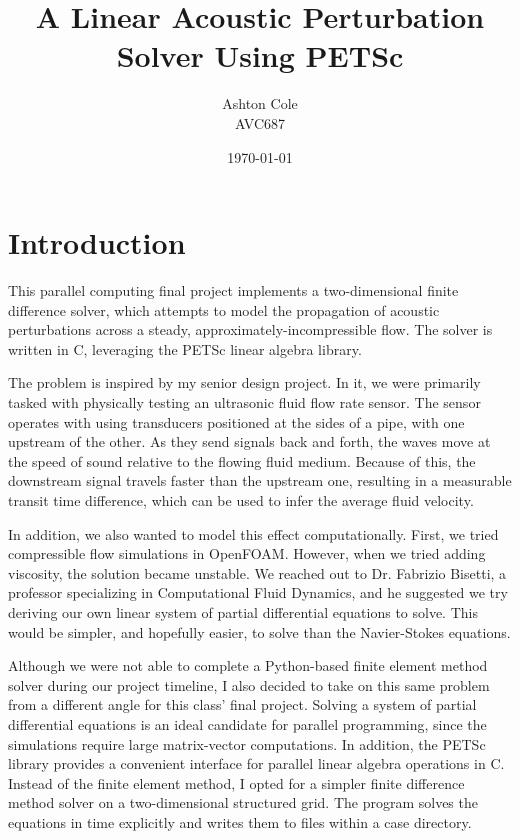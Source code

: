 \documentclass{article}
\title{A Linear Acoustic Perturbation Solver Using PETSc}
\author{Ashton Cole\\AVC687}
\date{\today}
\begin{document}
\maketitle

\section{Introduction}

This parallel computing final project implements a two-dimensional finite difference solver, which attempts to model the propagation of acoustic perturbations across a steady, approximately-incompressible flow. The solver is written in C, leveraging the PETSc linear algebra library.

The problem is inspired by my senior design project. In it, we were primarily tasked with physically testing an ultrasonic fluid flow rate sensor. The sensor operates with using transducers positioned at the sides of a pipe, with one upstream of the other. As they send signals back and forth, the waves move at the speed of sound relative to the flowing fluid medium. Because of this, the downstream signal travels faster than the upstream one, resulting in a measurable transit time difference, which can be used to infer the average fluid velocity.

In addition, we also wanted to model this effect computationally. First, we tried compressible flow simulations in OpenFOAM. However, when we tried adding viscosity, the solution became unstable. We reached out to Dr. Fabrizio Bisetti, a professor specializing in Computational Fluid Dynamics, and he suggested we try deriving our own linear system of partial differential equations to solve. This would be simpler, and hopefully easier, to solve than the Navier-Stokes equations.

Although we were not able to complete a Python-based finite element method solver during our project timeline, I also decided to take on this same problem from a different angle for this class' final project. Solving a system of partial differential equations is an ideal candidate for parallel programming, since the simulations require large matrix-vector computations. In addition, the PETSc library provides a convenient interface for parallel linear algebra operations in C. Instead of the finite element method, I opted for a simpler finite difference method solver on a two-dimensional structured grid. The program solves the equations in time explicitly and writes them to files within a case directory.
\end{document}
